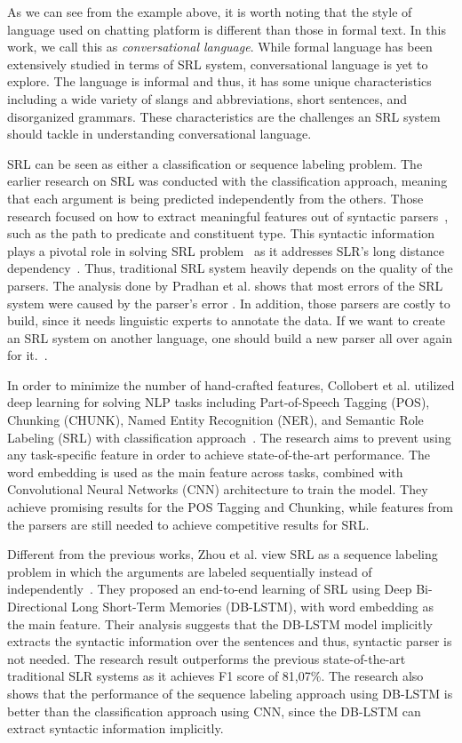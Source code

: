 	As we can see from the example above, it is worth noting that the style of language used on chatting platform is different than those in formal text. In this work, we call this as \textit{conversational language}. While formal language has been extensively studied in terms of SRL system, conversational language is yet to explore. The language is informal and thus, it has some unique characteristics including a wide variety of slangs and abbreviations, short sentences, and disorganized grammars. These characteristics are the challenges an SRL system should tackle in understanding conversational language.
	
	SRL can be seen as either a classification or sequence labeling problem. The earlier research on SRL was conducted with the classification approach, meaning that each argument is being predicted independently from the others. Those research focused on how to extract meaningful features out of syntactic parsers~\cite{gildea2002automatic, gildea2002necessity, pradhan2005semantic}, such as the path to predicate and constituent type. This syntactic information plays a pivotal role in solving SRL problem~\cite{punyakanok2008importance} as it addresses SLR's long distance dependency~\cite{zhou2015end}. Thus, traditional SRL system heavily depends on the quality of the parsers. The analysis done by Pradhan et al. shows that most errors of the SRL system were caused by the parser's error \cite{pradhan2005semantic}. In addition, those parsers are costly to build, since it needs linguistic experts to annotate the data. If we want to create an SRL system on another language, one should build a new parser all over again for it.~\cite{zhou2015end}.
	
	In order to minimize the number of hand-crafted features, Collobert et al. utilized deep learning for solving NLP tasks including Part-of-Speech Tagging (POS), Chunking (CHUNK), Named Entity Recognition (NER), and Semantic Role Labeling (SRL) with classification approach~\cite{collobert2011natural}. The research aims to prevent using any task-specific feature in order to achieve state-of-the-art performance. The word embedding is used as the main feature across tasks, combined with Convolutional Neural Networks (CNN) architecture to train the model. They achieve promising results for the POS Tagging and Chunking, while features from the parsers are still needed to achieve competitive results for SRL.
	
	Different from the previous works, Zhou et al. view SRL as a sequence labeling problem in which the arguments are labeled sequentially instead of independently~\cite{zhou2015end}. They proposed an end-to-end learning of SRL using Deep Bi-Directional Long Short-Term Memories (DB-LSTM), with word embedding as the main feature. Their analysis suggests that the DB-LSTM model implicitly extracts the syntactic information over the sentences and thus, syntactic parser is not needed. The research result outperforms the previous state-of-the-art traditional SLR systems as it achieves F1 score of 81,07\%. The research also shows that the performance of the sequence labeling approach using DB-LSTM is better than the classification approach using CNN, since the DB-LSTM can extract syntactic information implicitly.
	
